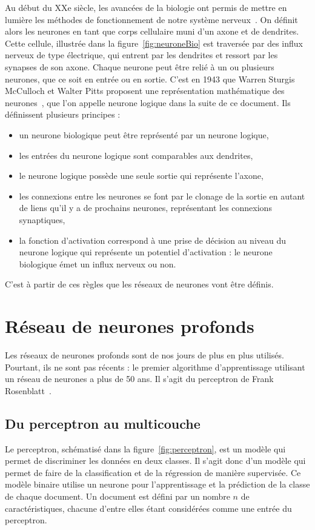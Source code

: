 
Au début du XXe siècle, les avancées de la biologie ont permis de mettre en lumière les méthodes de fonctionnement de notre système nerveux~\cite{Cajal1906}. On définit alors les neurones en tant que corps cellulaire muni d’un axone et de dendrites. Cette cellule, illustrée dans la figure~\ref{fig:neuroneBio} est traversée par des influx nerveux de type électrique, qui entrent par les dendrites et ressort par les synapses de son axone. Chaque neurone peut être relié à un ou plusieurs neurones, que ce soit en entrée ou en sortie.
C'est en 1943 que Warren Sturgis McCulloch et Walter Pitts proposent une représentation mathématique des neurones~\cite{McCulloch1943}, que l'on appelle neurone logique dans la suite de ce document. Ils définissent plusieurs principes :
\begin{itemize}
  \item un neurone biologique peut être représenté par un neurone logique,
  \item les entrées du neurone logique sont comparables aux dendrites,
  \item le neurone logique possède une seule sortie qui représente l'axone,
  \item les connexions entre les neurones se font par le clonage de la sortie en autant de liens qu'il y a de prochains neurones, représentant les connexions synaptiques,
  \item la fonction d'activation correspond à une prise de décision au niveau du neurone logique qui représente un potentiel d'activation : le neurone biologique émet un influx nerveux ou non.
\end{itemize}
C'est à partir de ces règles que les réseaux de neurones %
vont être définis.

\section{Réseau de neurones profonds}
Les réseaux de neurones profonds sont de nos jours de plus en plus utilisés. Pourtant, ils ne sont pas récents : le premier algorithme d'apprentissage utilisant un réseau de neurones a plus de 50 ans. Il s'agit du perceptron de Frank Rosenblatt~\cite{Rosenblatt1957}.

\subsection{Du perceptron au multicouche}

Le perceptron, schématisé dans la figure~\ref{fig:perceptron}, est un modèle qui permet de discriminer les données en deux classes. Il s'agit donc d'un modèle qui permet de faire de la classification et de la régression de manière supervisée. Ce modèle binaire utilise un neurone pour l'apprentissage et la prédiction de la classe de chaque document. Un document est défini par un nombre $n$ de caractéristiques, chacune d'entre elles étant considérées comme une entrée du perceptron.

